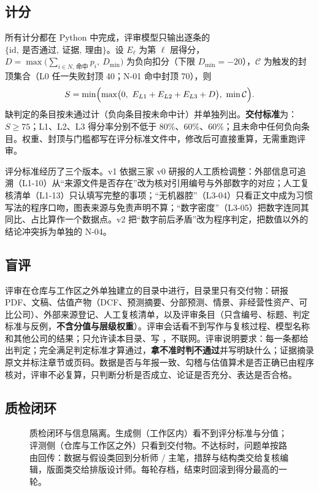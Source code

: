 \subsection{计分}
所有计分都在 Python 中完成，评审模型只输出逐条的 $\{\text{id},\ \text{是否通过},\ \text{证据},\ \text{理由}\}$。设 $E_\ell$ 为第 $\ell$ 层得分，$D=\max\bigl(\sum_{i\in N,\,\text{命中}} p_i,\ D_{\min}\bigr)$ 为负向扣分（下限 $D_{\min}=-20$），$\mathcal{C}$ 为触发的封顶集合（L0 任一失败封顶 40；N-01 命中封顶 70），则
\begin{equation}
  S = \min\Bigl(\max\bigl(0,\ E_{L1}+E_{L2}+E_{L3}+D\bigr),\ \min\mathcal{C}\Bigr).
\end{equation}
缺判定的条目按未通过计（负向条目按未命中计）并单独列出。\textbf{交付标准}为：$S\ge 75$；L1、L2、L3 得分率分别不低于 80\%、60\%、60\%；且未命中任何负向条目。权重、封顶与门槛都写在评分标准文件中，修改后可直接重算，无需重跑评审。

评分标准经历了三个版本。v1 依据三家 v0 研报的人工质检调整：外部信息可追溯（L1-10）从“来源文件是否存在”改为核对引用编号与外部数字的对应；人工复核清单（L1-13）只认填写完整的事项；“无机器腔”（L3-04）只看正文中成为习惯写法的程序口吻，图表来源与免责声明不算；“数字密度”（L3-05）把数字连同其同比、占比算作一个数据点。v2 把“数字前后矛盾”改为程序判定，把数值以外的结论冲突拆为单独的 N-04。

\subsection{盲评}
评审在仓库与工作区之外单独建立的目录中进行，目录里只有交付物：研报 PDF、文稿、估值产物（DCF、预测摘要、分部预测、情景、非经营性资产、可比公司）、外部来源登记、人工复核清单，以及评审条目（只含编号、标题、判定标准与反例，\textbf{不含分值与层级权重}）。评审会话看不到写作与复核过程、模型名称和其他公司的结果；只允许读本目录、写 ，不联网。评审说明要求：每一条都给出判定；完全满足判定标准才算通过，\textbf{拿不准时判不通过}并写明缺什么；证据摘录原文并标注章节或页码。数据是否与年报一致、勾稽与估值算术是否正确已由程序核对，评审不必复算，只判断分析是否成立、论证是否充分、表达是否合格。

\subsection{质检闭环}
\label{sec:refine}

\begin{figure}[t]
  \centering
  \caption{质检闭环与信息隔离。生成侧（工作区内）看不到评分标准与分值；评测侧（仓库与工作区之外）只看到交付物。不达标时，问题单按路由回传：数据与假设类回到分析师 / 主笔，措辞与结构类交给复核编辑，版面类交给排版设计师。每轮存档，结束时回滚到得分最高的一轮。}
  \label{fig:refine}
\end{figure}

